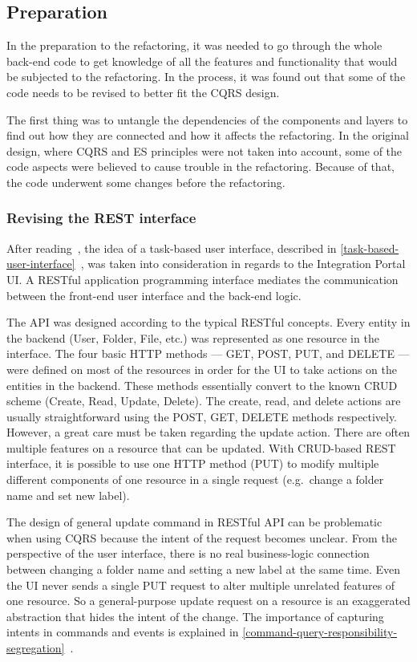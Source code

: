 \documentclass{book}
\begin{document}
\subsection{Preparation}\label{preparation}

In the preparation to the refactoring, it was needed to go through the
whole back-end code to get knowledge of all the features and
functionality that would be subjected to the refactoring. In the
process, it was found out that some of the code needs to be revised to
better fit the CQRS design.

The first thing was to untangle the dependencies of the components and
layers to find out how they are connected and how it affects the
refactoring. In the original design, where CQRS and ES principles were
not taken into account, some of the code aspects were believed to cause
trouble in the refactoring. Because of that, the code underwent some
changes before the refactoring.

\subsubsection{Revising the REST
interface}\label{revising-the-rest-interface}

After reading~\cite{journey}, the idea of a task-based user interface,
described in \ref{task-based-user-interface}~, was taken into consideration in
regards to the Integration Portal UI. A RESTful application programming
interface mediates the communication between the front-end user
interface and the back-end logic.

The API was designed according to the typical RESTful concepts. Every
entity in the backend (User, Folder, File, etc.) was represented as one
resource in the interface. The four basic HTTP methods --- GET, POST,
PUT, and DELETE --- were defined on most of the resources in order for
the UI to take actions on the entities in the backend. These methods
essentially convert to the known CRUD scheme (Create, Read, Update,
Delete). The create, read, and delete actions are usually
straightforward using the POST, GET, DELETE methods respectively.
However, a great care must be taken regarding the update action. There
are often multiple features on a resource that can be updated. With
CRUD-based REST interface, it is possible to use one HTTP method (PUT)
to modify multiple different components of one resource in a single
request (e.g.~change a folder name and set new label).

The design of general update command in RESTful API can be problematic
when using CQRS because the intent of the request becomes unclear. From
the perspective of the user interface, there is no real business-logic
connection between changing a folder name and setting a new label at the
same time. Even the UI never sends a single PUT request to alter multiple
unrelated features of one resource. So a general-purpose update request
on a resource is an exaggerated abstraction that hides the intent of the
change. The importance of capturing intents in commands and events is
explained in \ref{command-query-responsibility-segregation}~.
\end{document}
